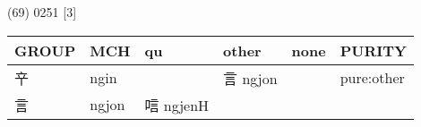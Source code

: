 \documentclass[14pt,a4paper]{scrartcl}
\begin{document}
(69) 0251 {[}3{]}

\begin{longtable}[c]{@{}llllll@{}}
\toprule
\begin{minipage}[b]{0.14\columnwidth}\raggedright\strut
GROUP
\strut\end{minipage} &
\begin{minipage}[b]{0.14\columnwidth}\raggedright\strut
MCH
\strut\end{minipage} &
\begin{minipage}[b]{0.14\columnwidth}\raggedright\strut
qu
\strut\end{minipage} &
\begin{minipage}[b]{0.14\columnwidth}\raggedright\strut
other
\strut\end{minipage} &
\begin{minipage}[b]{0.14\columnwidth}\raggedright\strut
none
\strut\end{minipage} &
\begin{minipage}[b]{0.14\columnwidth}\raggedright\strut
PURITY
\strut\end{minipage}\tabularnewline
\midrule
\endhead
\begin{minipage}[t]{0.14\columnwidth}\raggedright\strut
䇂
\strut\end{minipage} &
\begin{minipage}[t]{0.14\columnwidth}\raggedright\strut
ngin
\strut\end{minipage} &
\begin{minipage}[t]{0.14\columnwidth}\raggedright\strut
\strut\end{minipage} &
\begin{minipage}[t]{0.14\columnwidth}\raggedright\strut
言 ngjon
\strut\end{minipage} &
\begin{minipage}[t]{0.14\columnwidth}\raggedright\strut
\strut\end{minipage} &
\begin{minipage}[t]{0.14\columnwidth}\raggedright\strut
pure:other
\strut\end{minipage}\tabularnewline
\begin{minipage}[t]{0.14\columnwidth}\raggedright\strut
言
\strut\end{minipage} &
\begin{minipage}[t]{0.14\columnwidth}\raggedright\strut
ngjon
\strut\end{minipage} &
\begin{minipage}[t]{0.14\columnwidth}\raggedright\strut
唁 ngjenH
\strut\end{minipage} &

\end{longtable}
\end{document}
